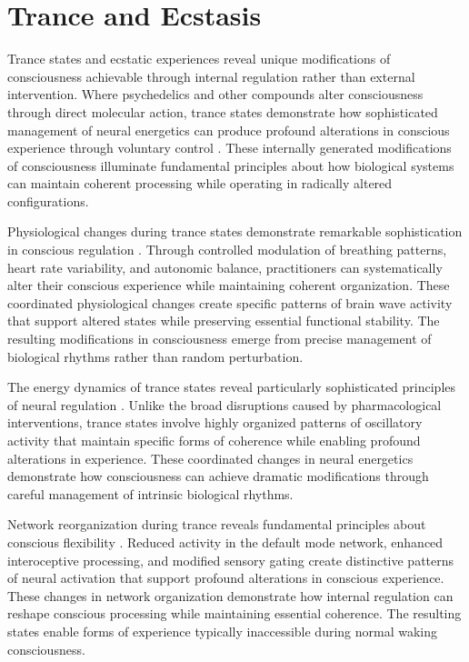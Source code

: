 \section{Trance and Ecstasis}

Trance states and ecstatic experiences reveal unique modifications of consciousness achievable through internal regulation rather than external intervention. Where psychedelics and other compounds alter consciousness through direct molecular action, trance states demonstrate how sophisticated management of neural energetics can produce profound alterations in conscious experience through voluntary control \cite{Rouget1985}. These internally generated modifications of consciousness illuminate fundamental principles about how biological systems can maintain coherent processing while operating in radically altered configurations.

Physiological changes during trance states demonstrate remarkable sophistication in conscious regulation \cite{Becker2004}. Through controlled modulation of breathing patterns, heart rate variability, and autonomic balance, practitioners can systematically alter their conscious experience while maintaining coherent organization. These coordinated physiological changes create specific patterns of brain wave activity that support altered states while preserving essential functional stability. The resulting modifications in consciousness emerge from precise management of biological rhythms rather than random perturbation.

The energy dynamics of trance states reveal particularly sophisticated principles of neural regulation \cite{Lewis2003}. Unlike the broad disruptions caused by pharmacological interventions, trance states involve highly organized patterns of oscillatory activity that maintain specific forms of coherence while enabling profound alterations in experience. These coordinated changes in neural energetics demonstrate how consciousness can achieve dramatic modifications through careful management of intrinsic biological rhythms.

Network reorganization during trance reveals fundamental principles about conscious flexibility \cite{Wier2009}. Reduced activity in the default mode network, enhanced interoceptive processing, and modified sensory gating create distinctive patterns of neural activation that support profound alterations in conscious experience. These changes in network organization demonstrate how internal regulation can reshape conscious processing while maintaining essential coherence. The resulting states enable forms of experience typically inaccessible during normal waking consciousness.

